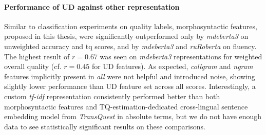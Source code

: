 \paragraph{\label{pg:doc_err_ud_vs_all}Performance of UD against other representation}
Similar to classification experiments on quality labels, morphosyntactic features, proposed in this thesis, were significantly outperformed only by \textit{mdeberta3} on unweighted accuracy and tq scores, and by \textit{mdeberta3} and \textit{ruRoberta} on fluency.
The highest result of $r=0.67$ was seen on \textit{mdeberta3} representations for weighted overall quality (cf. $r=0.45$ for UD features). %
As expected, \textit{collgram} and \textit{ngram} features implicitly present in \textit{all} were not helpful and introduced noise, showing slightly lower performance than UD feature set across all scores. 
Interestingly, a custom \textit{tf-idf} representation consistently performed better than both morphosyntactic features and TQ-estimation-dedicated cross-lingual sentence embedding model from \textit{TransQuest} in absolute terms, but we do not have enough data to see statistically significant results on these comparisons.

